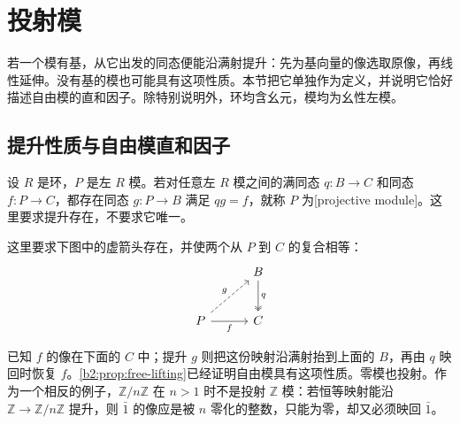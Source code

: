 
\section{投射模}
\label{b2:sec:0701}

若一个模有基，从它出发的同态便能沿满射提升：先为基向量的像选取原像，再线性延伸。没有基的模也可能具有这项性质。本节把它单独作为定义，并说明它恰好描述自由模的直和因子。除特别说明外，环均含幺元，模均为幺性左模。

%
%

\subsection{提升性质与自由模直和因子}
\label{b2:subsec:0701:01}

\begin{definition}\label{b2:def:projective-module}
	设 \(R\) 是环，\(P\) 是左 \(R\) 模。若对任意左 \(R\) 模之间的满同态 \(q:B\to C\) 和同态 \(f:P\to C\)，都存在同态 \(g:P\to B\) 满足 \(qg=f\)，就称 \(P\) 为[projective module]。这里要求提升存在，不要求它唯一。
\end{definition}

这里要求下图中的虚箭头存在，并使两个从 \(P\) 到 \(C\) 的复合相等：
\[
	\begin{tikzcd}[column sep=3em,row sep=2.5em]
		& B \arrow[d,two heads,"q"] \\
		P \arrow[r,"f"'] \arrow[ur,dashed,"g"] & C
	\end{tikzcd}
\]

已知 \(f\) 的像在下面的 \(C\) 中；提升 \(g\) 则把这份映射沿满射抬到上面的 \(B\)，再由 \(q\) 映回时恢复 \(f\)。\cref{b2:prop:free-lifting}已经证明自由模具有这项性质。零模也投射。作为一个相反的例子，\(\mathbb Z/n\mathbb Z\) 在 \(n>1\) 时不是投射 \(\mathbb Z\) 模：若恒等映射能沿 \(\mathbb Z\to\mathbb Z/n\mathbb Z\) 提升，则 \(\bar1\) 的像应是被 \(n\) 零化的整数，只能为零，却又必须映回 \(\bar1\)。

